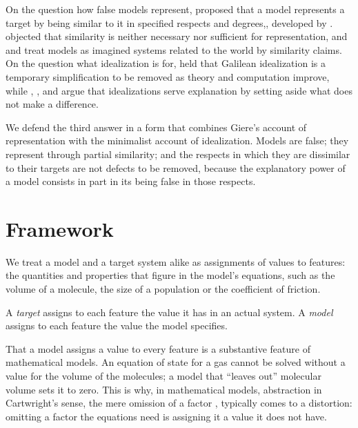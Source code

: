\documentclass{situationist-preprint}
\begin{document}
On the question how false models represent, \citet{Giere1988,Giere2004} proposed that a model represents a target by being similar to it in specified respects and degrees,, developed by \citet{Weisberg2013}. \citet{Suarez2003} objected that similarity is neither necessary nor sufficient for representation, and \citet{Frigg2010} and \citet{GodfreySmith2006} treat models as imagined systems related to the world by similarity claims. On the question what idealization is for, \citet{McMullin1985} held that Galilean idealization is a temporary simplification to be removed as theory and computation improve, while \citet{Strevens2008}, \citet{Batterman2002}, \citet{BattermanRice2014} and \citet{Potochnik2017} argue that idealizations serve explanation by setting aside what does not make a difference.

We defend the third answer in a form that combines Giere's account of representation with the minimalist account of idealization. Models are false; they represent through partial similarity; and the respects in which they are dissimilar to their targets are not defects to be removed, because the explanatory power of a model consists in part in its being false in those respects.

\section{Framework}

We treat a model and a target system alike as assignments of values to features: the quantities and properties that figure in the model's equations, such as the volume of a molecule, the size of a population or the coefficient of friction.

\begin{definition}[Assignments]\label{d:assign}
A \emph{target} assigns to each feature the value it has in an actual system. A \emph{model} assigns to each feature the value the model specifies.
\end{definition}

That a model assigns a value to every feature is a substantive feature of mathematical models. An equation of state for a gas cannot be solved without a value for the volume of the molecules; a model that \enquote{leaves out} molecular volume sets it to zero. This is why, in mathematical models, abstraction in Cartwright's sense, the mere omission of a factor \citep{Cartwright1989}, typically comes to a distortion: omitting a factor the equations need is assigning it a value it does not have.
\end{document}
